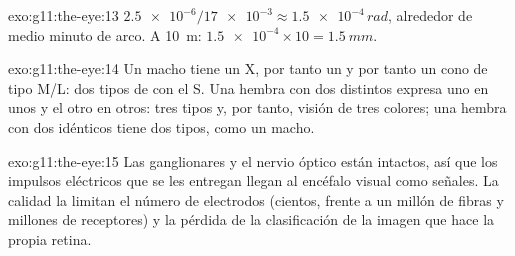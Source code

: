 \begin{solution}{exo:g11:the-eye:13}
$\num{2.5e-6}/\num{17e-3} \approx \num{1.5e-4}\,\unit{rad}$, alrededor
de medio minuto de arco. A \qty{10}{m}: $\num{1.5e-4} \times 10 =
\qty{1.5}{mm}$.
\end{solution}

\begin{solution}{exo:g11:the-eye:14}
Un macho tiene un X, por tanto un  y por tanto un cono de tipo
M/L: dos tipos de  con el S. Una hembra con dos  distintos
expresa uno en unos  y el otro en otros: tres tipos y, por tanto,
visión de tres colores; una hembra con dos  idénticos tiene dos
tipos, como un macho.
\end{solution}

\begin{solution}{exo:g11:the-eye:15}
Las  ganglionares y el nervio óptico están intactos, así que los
impulsos eléctricos que se les entregan llegan al encéfalo visual como
señales. La calidad la limitan el número de electrodos (cientos, frente
a un millón de fibras y millones de receptores) y la pérdida de la
clasificación de la imagen que hace la propia retina.
\end{solution}

